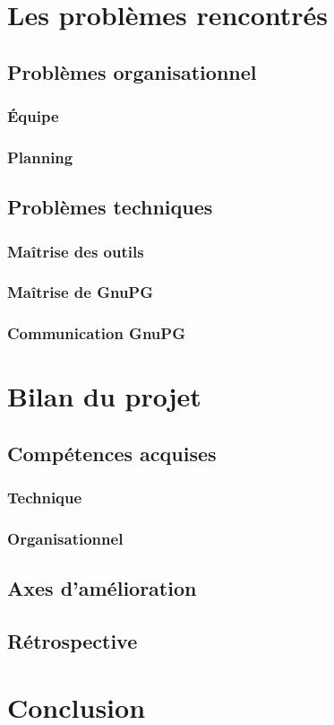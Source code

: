 \documentclass{../res/univ-projet}
\begin{document}
\section{Les problèmes rencontrés}

  \subsection{Problèmes organisationnel}
    \subsubsection{Équipe}
    \subsubsection{Planning}
    
  \subsection{Problèmes techniques}
    \subsubsection{Maîtrise des outils}
    \subsubsection{Maîtrise de GnuPG}
    \subsubsection{Communication GnuPG}
  

\section{Bilan du projet}
  \subsection{Compétences acquises}
    \subsubsection{Technique}
    \subsubsection{Organisationnel}
  \subsection{Axes d'amélioration}
  \subsection{Rétrospective}

\section{Conclusion}
\end{document}
